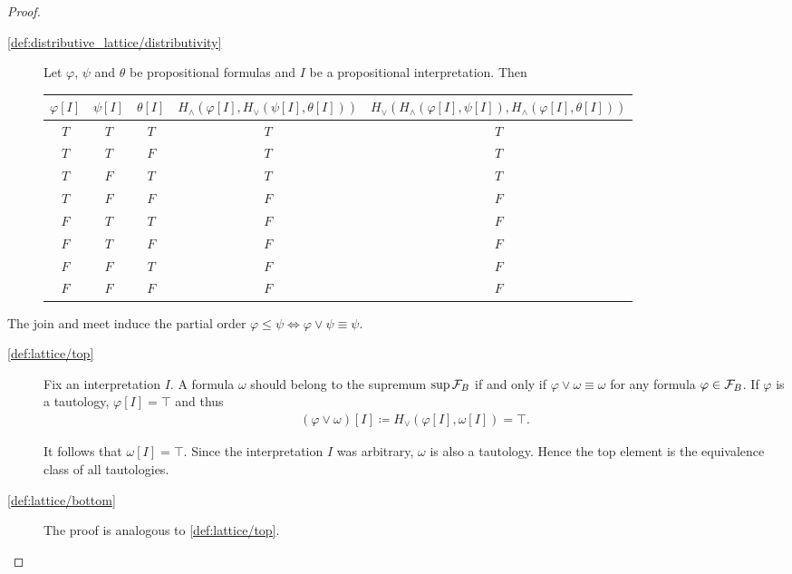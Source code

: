 \begin{proof}
\begin{description}
    \item[\ref{def:distributive_lattice/distributivity}] Let $\varphi$, $\psi$ and $\theta$ be propositional formulas and $I$ be a propositional interpretation. Then
    \begin{center}
      \begin{tabular}{c c c | c | c}
        $\varphi[I]$ & $\psi[I]$ & $\theta[I]$ & \small{$H_\land(\varphi[I], H_\lor(\psi[I], \theta[I]))$} & \small{$H_\lor(H_\land(\varphi[I], \psi[I]), H_\land(\varphi[I], \theta[I]))$} \\
        \hline
        $T$          & $T$       & $T$         & $T$                                               & $T$    \\
        $T$          & $T$       & $F$         & $T$                                               & $T$    \\
        $T$          & $F$       & $T$         & $T$                                               & $T$    \\
        $T$          & $F$       & $F$         & $F$                                               & $F$    \\
        $F$          & $T$       & $T$         & $F$                                               & $F$    \\
        $F$          & $T$       & $F$         & $F$                                               & $F$    \\
        $F$          & $F$       & $T$         & $F$                                               & $F$    \\
        $F$          & $F$       & $F$         & $F$                                               & $F$
      \end{tabular}
    \end{center}
  \end{description}

  The join and meet induce the partial order $\varphi \leq \psi \iff \varphi \lor \psi \equiv \psi$.

  \begin{description}
    \item[\ref{def:lattice/top}] Fix an interpretation $I$. A formula $\omega$ should belong to the supremum $\sup \mathcal F_B$ if and only if $\varphi \lor \omega \equiv \omega$ for any formula $\varphi \in \mathcal F_B$. If $\varphi$ is a tautology, $\varphi[I] = \top$ and thus
    \begin{align*}
      (\varphi \lor \omega)[I] \coloneqq H_\lor(\varphi[I], \omega[I]) = \top.
    \end{align*}

    It follows that $\omega[I] = \top$. Since the interpretation $I$ was arbitrary, $\omega$ is also a tautology. Hence the top element is the equivalence class of all tautologies.

    \item[\ref{def:lattice/bottom}] The proof is analogous to \ref{def:lattice/top}.
  \end{description}
\end{proof}

